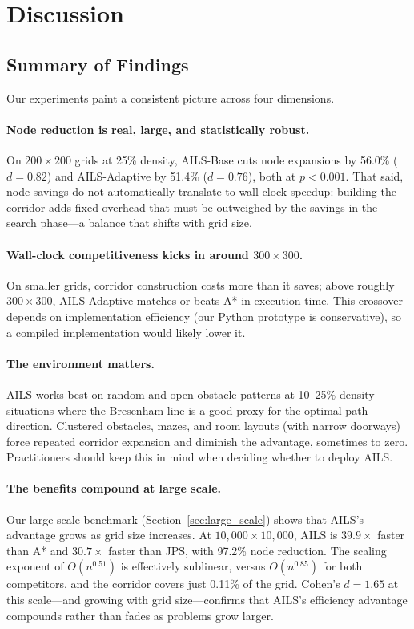 \documentclass[journal]{IEEEtran}
\begin{document}
\section{Discussion}
\label{sec:discussion}

\subsection{Summary of Findings}

Our experiments paint a consistent picture across four dimensions.

\paragraph{Node reduction is real, large, and statistically robust.}
On $200{\times}200$ grids at 25\% density, AILS-Base cuts node expansions by 56.0\% ($d = 0.82$) and AILS-Adaptive by 51.4\% ($d = 0.76$), both at $p < 0.001$.
That said, node savings do not automatically translate to wall-clock speedup: building the corridor adds fixed overhead that must be outweighed by the savings in the search phase---a balance that shifts with grid size.

\paragraph{Wall-clock competitiveness kicks in around $300{\times}300$.}
On smaller grids, corridor construction costs more than it saves; above roughly $300{\times}300$, AILS-Adaptive matches or beats A* in execution time.
This crossover depends on implementation efficiency (our Python prototype is conservative), so a compiled implementation would likely lower it.

\paragraph{The environment matters.}
AILS works best on random and open obstacle patterns at 10--25\% density---situations where the Bresenham line is a good proxy for the optimal path direction.
Clustered obstacles, mazes, and room layouts (with narrow doorways) force repeated corridor expansion and diminish the advantage, sometimes to zero.
Practitioners should keep this in mind when deciding whether to deploy AILS.

\paragraph{The benefits compound at large scale.}
Our large-scale benchmark (Section~\ref{sec:large_scale}) shows that AILS's advantage grows as grid size increases.
At $10{,}000{\times}10{,}000$, AILS is $39.9{\times}$ faster than A* and $30.7{\times}$ faster than JPS, with 97.2\% node reduction.
The scaling exponent of $O(n^{0.51})$ is effectively sublinear, versus $O(n^{0.85})$ for both competitors, and the corridor covers just 0.11\% of the grid.
Cohen's $d = 1.65$ at this scale---and growing with grid size---confirms that AILS's efficiency advantage compounds rather than fades as problems grow larger.
\end{document}
